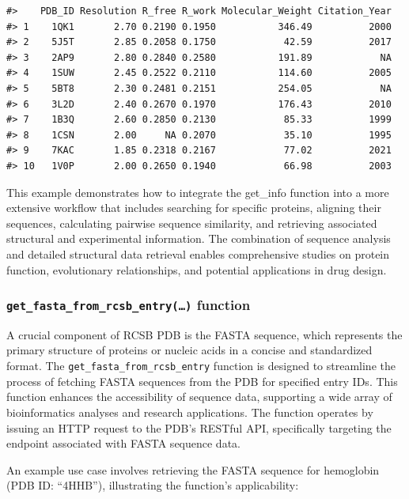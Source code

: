\begin{verbatim}
#>    PDB_ID Resolution R_free R_work Molecular_Weight Citation_Year
#> 1    1QK1       2.70 0.2190 0.1950           346.49          2000
#> 2    5J5T       2.85 0.2058 0.1750            42.59          2017
#> 3    2AP9       2.80 0.2840 0.2580           191.89            NA
#> 4    1SUW       2.45 0.2522 0.2110           114.60          2005
#> 5    5BT8       2.30 0.2481 0.2151           254.05            NA
#> 6    3L2D       2.40 0.2670 0.1970           176.43          2010
#> 7    1B3Q       2.60 0.2850 0.2130            85.33          1999
#> 8    1CSN       2.00     NA 0.2070            35.10          1995
#> 9    7KAC       1.85 0.2318 0.2167            77.02          2021
#> 10   1V0P       2.00 0.2650 0.1940            66.98          2003
\end{verbatim}

This example demonstrates how to integrate the get\_info function into a more extensive workflow that includes searching for specific proteins, aligning their sequences, calculating pairwise sequence similarity, and retrieving associated structural and experimental information. The combination of sequence analysis and detailed structural data retrieval enables comprehensive studies on protein function, evolutionary relationships, and potential applications in drug design.

\subsubsection{\texorpdfstring{\texttt{get\_fasta\_from\_rcsb\_entry(…)} function}{get\_fasta\_from\_rcsb\_entry(\ldots) function}}\label{get_fasta_from_rcsb_entry-function}

A crucial component of RCSB PDB is the FASTA sequence, which represents the primary structure of proteins or nucleic acids in a concise and standardized format. The \texttt{get\_fasta\_from\_rcsb\_entry} function is designed to streamline the process of fetching FASTA sequences from the PDB for specified entry IDs. This function enhances the accessibility of sequence data, supporting a wide array of bioinformatics analyses and research applications. The function operates by issuing an HTTP request to the PDB's RESTful API, specifically targeting the endpoint associated with FASTA sequence data.

An example use case involves retrieving the FASTA sequence for hemoglobin (PDB ID: ``4HHB''), illustrating the function's applicability:

